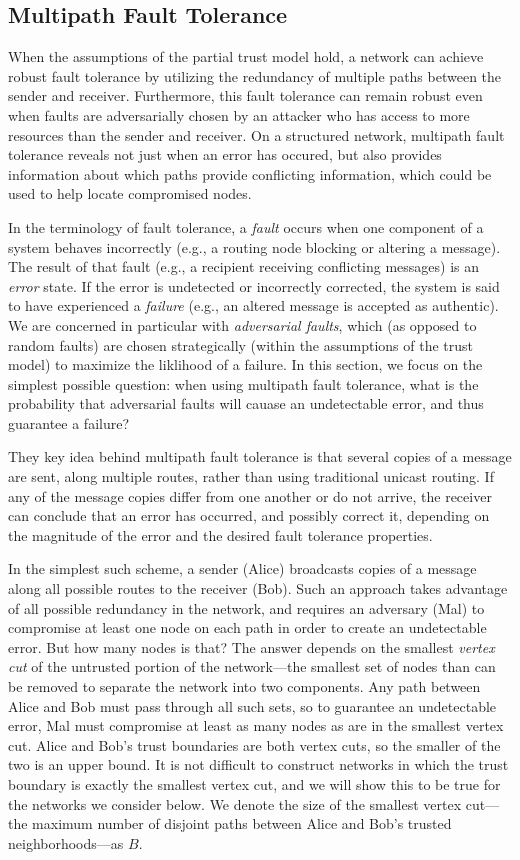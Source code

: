 \documentclass{sig-alternate-05-2015}
\begin{document}
\subsection{Multipath Fault Tolerance}

When the assumptions of the partial trust model hold, a network can achieve
robust fault tolerance by utilizing the redundancy of multiple paths
between the sender and receiver.
Furthermore, this fault tolerance can remain robust even when faults are
adversarially chosen by an attacker who has access to more resources
than the sender and receiver.
On a structured network, multipath fault tolerance reveals not just when
an error has occured, but also provides information about which paths provide
conflicting information,
which could be used to help locate compromised nodes.

In the terminology of fault tolerance, a {\em fault} occurs when one component
of a system behaves incorrectly (e.g., a routing node blocking or
altering a message).
The result of that fault (e.g., a recipient receiving conflicting messages)
is an {\em error} state.
If the error is undetected or incorrectly corrected, the system is
said to have experienced a {\em failure} (e.g., an altered message is
accepted as authentic).
We are concerned in particular with {\em adversarial faults},
which (as opposed to random faults)
are chosen strategically (within the assumptions of the trust model)
to maximize the liklihood of a failure.
In this section, we focus on the simplest possible question:
when using multipath fault tolerance,
what is the probability that adversarial faults will cauase an undetectable
error, and thus guarantee a failure?

They key idea behind multipath fault tolerance is that several copies of
a message are sent, along multiple routes,
rather than using traditional unicast routing.
If any of the message copies differ from one another or do not arrive,
the receiver can conclude that an error has occurred,
and possibly correct it, depending on the magnitude of the error
and the desired fault tolerance properties.

In the simplest such scheme, a sender (Alice) broadcasts copies of a message
along all possible routes to the receiver (Bob).
Such an approach takes advantage of all possible redundancy in the network,
and requires an adversary (Mal) to compromise at least one node on each path
in order to create an undetectable error.
But how many nodes is that?
The answer depends on the smallest {\em vertex cut} of the untrusted
portion of the network---the smallest set of nodes than can be removed
to separate the network into two components.
Any path between Alice and Bob must pass through all such sets,
so to guarantee an undetectable error, Mal must compromise at least as many
nodes as are in the smallest vertex cut.
Alice and Bob's trust boundaries are both vertex cuts,
so the smaller of the two is an upper bound.
It is not difficult to construct networks in which the trust boundary is exactly
the smallest vertex cut,
and we will show this to be true for the networks we consider below.
We denote the size of the smallest vertex cut---the
maximum number of disjoint paths between Alice and Bob's trusted
neighborhoods---as $B$.
\end{document}
